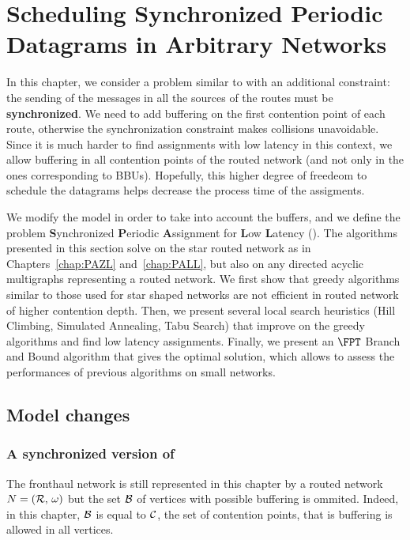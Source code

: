 
\chapter{Scheduling Synchronized Periodic Datagrams in Arbitrary Networks }
\label{chap:SPALL}
\minitoc

In this chapter, we consider a problem similar to \pall with an additional constraint: the sending of the messages in all the sources of the routes must be \textbf{synchronized}. We need to add buffering on the first contention point of each route, otherwise the synchronization constraint makes collisions unavoidable. Since it is much harder to find assignments with low latency in this context, we allow buffering in all contention points of the routed network (and not only in the ones corresponding to BBUs). Hopefully, this higher degree of freedeom to schedule the datagrams helps decrease the process time of the assigments.

We modify the model in order to take into account the buffers, and we define the problem \textbf{S}ynchronized \textbf{P}eriodic \textbf{A}ssignment for \textbf{L}ow \textbf{L}atency (\spall). The algorithms presented in this section solve \spall on the star routed network as in Chapters~\ref{chap:PAZL} and~\ref{chap:PALL}, but also on any directed acyclic multigraphs representing a routed network. We first show that greedy algorithms similar to those used for star shaped networks are not efficient in routed network of higher contention depth. Then, we present several local search heuristics (Hill Climbing, Simulated Annealing, Tabu Search) that improve on the greedy algorithms and find low latency assignments. Finally, we present an $\FPT$ Branch and Bound algorithm that gives the optimal solution, which allows to assess the performances of previous algorithms on small networks.


\section{Model changes}
\subsection{A synchronized version of \pall}

The fronthaul network is still represented in this chapter by a routed network $N = ({\cal R},\,\omega)$ but the set ${\cal B}$ of vertices with possible buffering is ommited. Indeed, in this chapter, ${\cal B}$ is equal to ${\cal C}$, the set of contention points, that is buffering is allowed in all vertices. 

